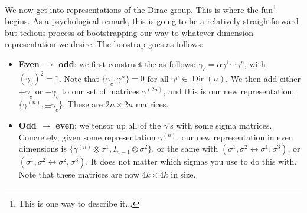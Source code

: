 \documentclass[11pt]{article}
\begin{document}
We now get into representations of the Dirac group.
This is where the fun\footnote{This is one way to describe
it$\ldots$} begins. As a psychological remark, this is going to be 
a relatively straightforward but tedious process of bootstrapping our 
way to whatever dimension representation we desire. The boostrap goes as follows:
\begin{itemize}
    \item \textbf{Even $\to$ odd}: we first construct the 
    as follows: $\gamma_c = \alpha \gamma^1 \cdots \gamma^n$,
    with $(\gamma_c)^2 = 1$. Note that $\{ \gamma_c, \gamma^\mu \} = 0$
    for all $\gamma^\mu \in \operatorname{Dir}(n)$. We then
    add either $+ \gamma_c$ or $- \gamma_c$ to our set of matrices
    $\gamma^{(2n)}$, and this is our new representation, $\{ \gamma^{(n)}, \pm \gamma_c \}$.
    These are $2n \times 2n$ matrices.
    \item \textbf{Odd $\to$ even}: we tensor up all of the $\gamma$'s with some sigma matrices. 
    Concretely, given some representation $\gamma^{(n)}$, our new representation 
    in even dimensions is $\{ \gamma^{(n)} \otimes \sigma^1, I_{n - 1} \otimes \sigma^2 \}$,
    or the same with $(\sigma^1, \sigma^2 \leftrightarrow \sigma^1, \sigma^3)$,
    or $(\sigma^1, \sigma^2 \leftrightarrow \sigma^2, \sigma^3)$.
    It does not matter which sigmas you use to do this with. 
    Note that these matrices are now $4k \times 4k$ in size.
\end{itemize}
\end{document}
